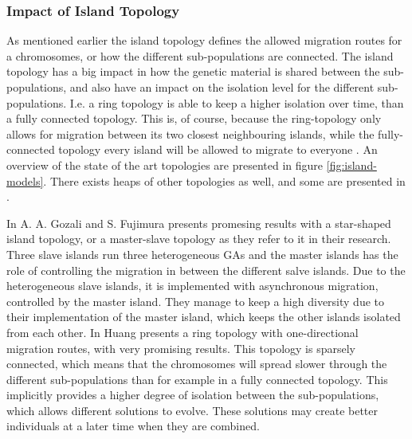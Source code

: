 \subsubsection{Impact of Island Topology}
As mentioned earlier the island topology defines the allowed migration routes for a chromosomes, or how the different sub-populations are connected. The island topology has a big impact in how the genetic material is shared between the sub-populations, and also have an impact on the isolation level for the different sub-populations. I.e. a ring topology is able to keep a higher isolation over time, than a fully connected topology. This is, of course, because the ring-topology only allows for migration between its two closest neighbouring islands, while the fully-connected topology every island will be allowed to migrate to everyone \cite{IGA:dynamic_im_based_on_spectral_clustering_in_ga}. An overview of the state of the art topologies are presented in figure \ref{fig:island-models}. There exists heaps of other topologies as well, and some are presented in \cite{IGA:survey-of-parallel-DGA,IGA:gong-fukunaga-island-model-random-hetereogeneous-parameter-settings}.

In \cite{IGA:Gozali2018} A. A. Gozali and S. Fujimura presents promesing results with a star-shaped island topology, or a master-slave topology as they refer to it in their research. Three slave islands run three heterogeneous GAs and the master islands has the role of controlling the migration in between the different salve islands. Due to the heterogeneous slave islands, it is implemented with asynchronous migration, controlled by the master island. They manage to keep a high diversity due to their implementation of the master island, which keeps the other islands isolated from each other. In \cite{IGA:DGA-optimization-of-wind-farm} Huang presents a ring topology with one-directional migration routes, with very promising results. This topology is sparsely connected, which means that the chromosomes will spread slower through the different sub-populations than for example in a fully connected topology. This implicitly provides a higher degree of isolation between the sub-populations, which allows different solutions to evolve. These solutions may create better individuals at a later time when they are combined. 

